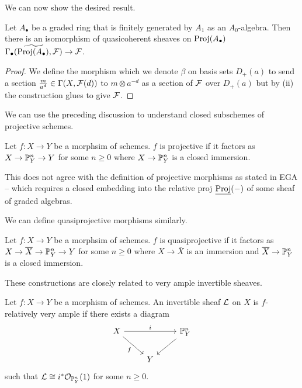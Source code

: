 We can now show the desired result. 
\begin{proposition}\label{prop: graded module correspondence for nice graded rings}
    Let $A_{\bullet}$ be a graded ring that is finitely generated by $A_{1}$ as an $A_{0}$-algebra. Then there is an isomorphism of quasicoherent sheaves on $\operatorname{Proj}(A_{\bullet})$ $\widetilde{\Gamma_{\bullet}(\operatorname{Proj}(A_{\bullet}),\mathcal{F})}\to\mathcal{F}$. 
\end{proposition}
\begin{proof}
    We define the morphism which we denote $\beta$ on basis sets $D_{+}(a)$ to send a section $\frac{m}{a^{d}}\in\Gamma(X,\mathcal{F}(d))$ to $m\otimes a^{-d}$ as a section of $\mathcal{F}$ over $D_{+}(a)$ but by  (ii) the construction glues to give $\mathcal{F}$. 
\end{proof}
We can use the preceding discussion to understand closed subschemes of projective schemes. 
\begin{definition}\label{def: projective morphism}
    Let $f:X\to Y$ be a  morphsim of schemes. $f$ is projective if it factors as $X\to\mathbb{P}^{n}_{Y}\to Y$ for some $n\geq0$ where $X\to\mathbb{P}^{n}_{Y}$ is a closed immersion. 
\end{definition}
\begin{remark}
    This does not agree with the definition of projective morphisms as stated in EGA -- which requires a closed embedding into the relative proj $\underline{\operatorname{Proj}}(-)$ of some sheaf of graded algebras. 
\end{remark}
We can define quasiprojective morphisms similarly. 
\begin{definition}\label{def: quasiprojective morphism}
    Let $f:X\to Y$ be a  morphsim of schemes. $f$ is quasiprojective if it factors as $X\to\overline{X}\to\mathbb{P}^{n}_{Y}\to Y$ for some $n\geq0$ where $X\to\overline{X}$ is an immersion and $\overline{X}\to\mathbb{P}^{n}_{Y}$ is a closed immersion. 
\end{definition}
These constructions are closely related to very ample invertible sheaves. 
\begin{definition}\label{def: very ample invertible sheaf}
    Let $f:X\to Y$ be a morphism of schemes. An invertible sheaf $\mathcal{L}$ on $X$ is $f$-relatively very ample if there exists a diagram 
    $$%
    \begin{tikzcd}
        X && {\PP^{n}_{Y}} \\
        & Y
        \arrow["i", from=1-1, to=1-3]
        \arrow["f"', from=1-1, to=2-2]
        \arrow[from=1-3, to=2-2]
    \end{tikzcd}$$
    such that $\mathcal{L}\cong i^{*}\mathcal{O}_{\mathbb{P}^{n}_{Y}}(1)$ for some $n\geq 0$. 
\end{definition}
